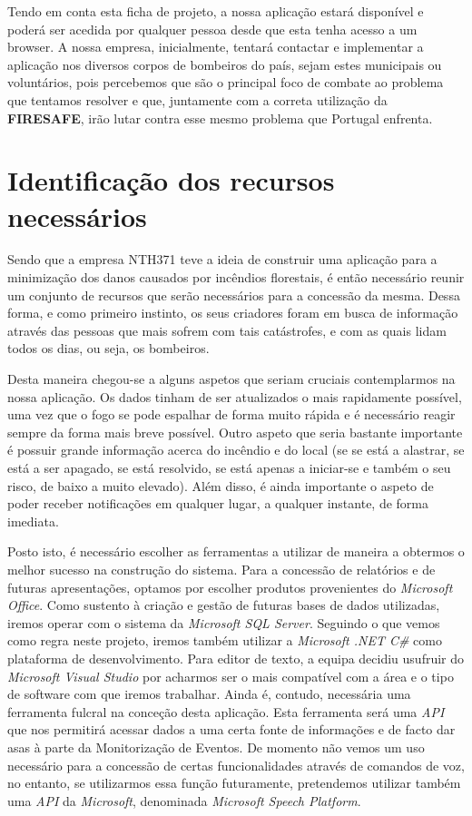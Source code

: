 \documentclass[a4paper,12pt]{scrreprt}
\newcommand{\tab}{
    \hspace{1cm}}
\begin{document}
        \tab Tendo em conta esta ficha de projeto, a nossa aplicação estará disponível e poderá ser acedida por qualquer pessoa desde que esta tenha acesso a um browser. A nossa empresa, inicialmente, tentará contactar e implementar a aplicação nos diversos corpos de bombeiros do país, sejam estes municipais ou voluntários, pois percebemos que são o principal foco de combate ao problema que tentamos resolver e que, juntamente com a correta utilização da \textbf{FIRESAFE}, irão lutar contra esse mesmo problema que Portugal enfrenta.

    \section{Identificação dos recursos necessários}
        \tab Sendo que a empresa NTH371 teve a ideia de construir uma aplicação para a minimização dos danos causados por incêndios florestais, é então necessário reunir um conjunto de recursos que serão necessários para a concessão da mesma. Dessa forma, e como primeiro instinto, os seus criadores foram em busca de informação através das pessoas que mais sofrem com tais catástrofes, e com as quais lidam todos os dias, ou seja, os bombeiros.

        \tab Desta maneira chegou-se a alguns aspetos que seriam cruciais contemplarmos na nossa aplicação. Os dados tinham de ser atualizados o mais rapidamente possível, uma vez que o fogo se pode espalhar de forma muito rápida e é necessário reagir sempre da forma mais breve possível. Outro aspeto que seria bastante importante é possuir grande informação acerca do incêndio e do local (se se está a alastrar, se está a ser apagado, se está resolvido, se está apenas a iniciar-se e também o seu risco, de baixo a muito elevado). Além disso, é ainda importante o aspeto de poder receber notificações em qualquer lugar, a qualquer instante, de forma imediata.
        
        \tab Posto isto, é necessário escolher as ferramentas a utilizar de maneira a  obtermos o melhor sucesso na construção do sistema. Para a concessão de relatórios e de futuras apresentações, optamos por escolher produtos provenientes do \textit{Microsoft Office}. Como sustento à criação e gestão de futuras bases de dados utilizadas, iremos operar com o sistema da \textit{Microsoft SQL Server}. Seguindo o que vemos como regra neste projeto, iremos também utilizar a \textit{Microsoft .NET C\#} como plataforma de desenvolvimento. Para editor de texto, a equipa decidiu usufruir do \textit{Microsoft Visual Studio} por acharmos ser o mais compatível com a área e o tipo de software com que iremos trabalhar. Ainda é, contudo, necessária uma ferramenta fulcral na conceção desta aplicação. Esta ferramenta será uma \textit{API} que nos permitirá acessar dados a uma certa fonte de informações e de facto dar asas à parte da Monitorização de Eventos. De momento não vemos um uso necessário para a concessão de certas funcionalidades através de comandos de voz, no entanto, se utilizarmos essa função futuramente, pretendemos utilizar também uma \textit{API} da \textit{Microsoft}, denominada \textit{Microsoft Speech Platform}.
\end{document}
